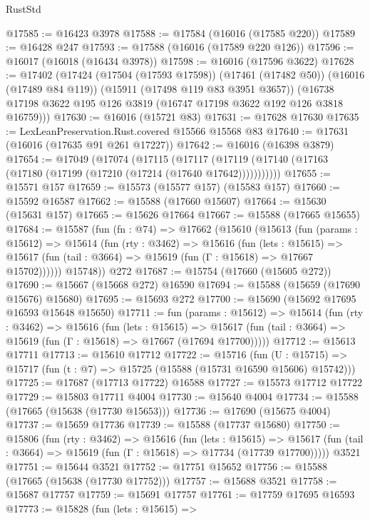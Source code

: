 \begin{lexlean}{RustStd}
\begin{coremodule}
@17585 := @16423 @3978
@17588 := @17584 (@16016 (@17585 @220))
@17589 := @16428 @247
@17593 := @17588 (@16016 (@17589 @220 @126))
@17596 := @16017 (@16018 (@16434 @3978))
@17598 := @16016 (@17596 @3622)
@17628 := @17402
    (@17424
      (@17504 (@17593 @17598))
      (@17461 (@17482 @50))
      (@16016 (@17489 @84 @119))
      (@15911 (@17498 @119 @83 @3951 @3657))
      (@16738 @17198 @3622 @195 @126 @3819 (@16747 @17198 @3622 @192 @126 @3818 @16759)))
@17630 := @16016 (@15721 @83)
@17631 := @17628 @17630
@17635 := LexLeanPreservation.Rust.covered @15566 @15568 @83
@17640 := @17631 (@16016 (@17635 @91 @261 @17227))
@17642 := @16016 (@16398 @3879)
@17654 := @17049
    (@17074
      (@17115
        (@17117 (@17119 (@17140 (@17163 (@17180 (@17199 (@17210 (@17214 (@17640 @17642)))))))))))
@17655 := @15571 @157
@17659 := @15573 (@15577 @157) (@15583 @157)
@17660 := @15592 @16587
@17662 := @15588 (@17660 @15607)
@17664 := @15630 (@15631 @157)
@17665 := @15626 @17664
@17667 := @15588 (@17665 @15655)
@17684 := @15587
    (fun (fn : @74) =>
    @17662
      (@15610
        (@15613
          (fun (params : @15612) =>
          @15614
            (fun (rty : @3462) =>
            @15616
              (fun (lets : @15615) =>
              @15617 (fun (tail : @3664) => @15619 (fun (Γ : @15618) => @17667 @15702))))))
        @15748))
    @272
@17687 := @15754 (@17660 (@15605 @272))
@17690 := @15667 (@15668 @272) @16590
@17694 := @15588 (@15659 (@17690 @15676) @15680)
@17695 := @15693 @272
@17700 := @15690 (@15692 @17695 @16593 @15648 @15650)
@17711 := fun (params : @15612) =>
  @15614
    (fun (rty : @3462) =>
    @15616
      (fun (lets : @15615) =>
      @15617 (fun (tail : @3664) => @15619 (fun (Γ : @15618) => @17667 (@17694 @17700)))))
@17712 := @15613 @17711
@17713 := @15610 @17712
@17722 := @15716
    (fun (U : @15715) => @15717 (fun (t : @7) => @15725 (@15588 (@15731 @16590 @15606) @15742)))
@17725 := @17687 (@17713 @17722) @16588
@17727 := @15573 @17712 @17722
@17729 := @15803 @17711 @4004
@17730 := @15640 @4004
@17734 := @15588 (@17665 (@15638 (@17730 @15653)))
@17736 := @17690 (@15675 @4004)
@17737 := @15659 @17736
@17739 := @15588 (@17737 @15680)
@17750 := @15806
    (fun (rty : @3462) =>
    @15616
      (fun (lets : @15615) =>
      @15617 (fun (tail : @3664) => @15619 (fun (Γ : @15618) => @17734 (@17739 @17700)))))
    @3521
@17751 := @15644 @3521
@17752 := @17751 @15652
@17756 := @15588 (@17665 (@15638 (@17730 @17752)))
@17757 := @15688 @3521
@17758 := @15687 @17757
@17759 := @15691 @17757
@17761 := @17759 @17695 @16593
@17773 := @15828
    (fun (lets : @15615) =>

\end{coremodule}
\end{lexlean}
